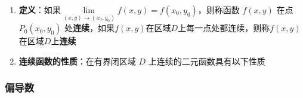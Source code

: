 \documentclass[../book.tex]{subfiles}
\begin{document}
    \begin{enumerate}
        \item \textbf{定义}：如果$\lim\limits_{(x,y) \to (x_0,y_0)} f(x,y) = f(x_0, y_0)$，则称函数 $f(x,y)$ 在点 $P_0(x_0,y_0)$ 处\textbf{连续}，如果$f(x, y)$在区域$D$上每一点处都连续，则称$f(x, y)$在区域$D$上\textbf{连续}
        \item \textbf{连续函数的性质}：在有界闭区域 $D$ 上连续的二元函数具有以下性质
    \end{enumerate}

    \subsubsection{偏导数}
\end{document}
